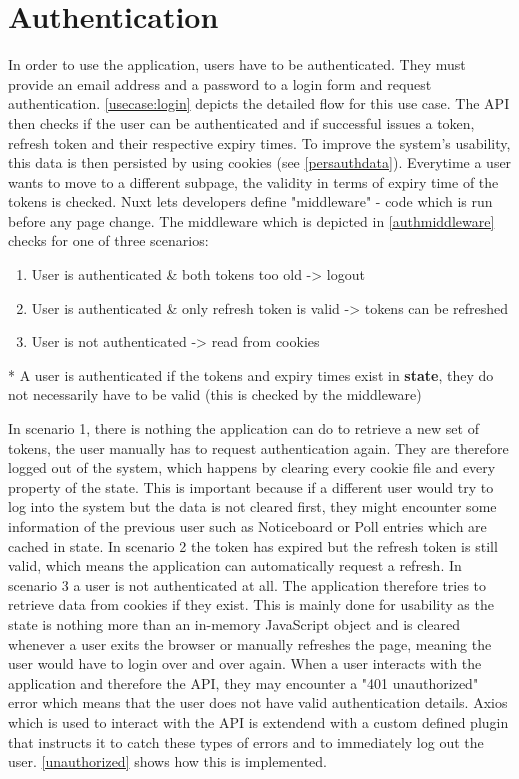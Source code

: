 \section{Authentication}
In order to use the application, users have to be authenticated. They must provide an email address and a password to a login form and request authentication. \autoref{usecase:login} depicts the detailed flow for this use case. The API then checks if the user can be authenticated and if successful issues a token, refresh token and their respective expiry times. To improve the system's usability, this data is then persisted by using cookies (see \autoref{persauthdata}). Everytime a user wants to move to a different subpage, the validity in terms of expiry time of the tokens is checked. Nuxt lets developers define "middleware" - code which is run before any page change. The middleware which is depicted in \autoref{authmiddleware} checks for one of three scenarios:

\begin{enumerate}
  \item User is authenticated \& both tokens too old -> logout
  \item User is authenticated \& only refresh token is valid -> tokens can be refreshed
  \item User is not authenticated -> read from cookies
\end{enumerate}

* A user is authenticated if the tokens and expiry times exist in \textbf{state}, they do not necessarily have to be valid (this is checked by the middleware) 

In scenario 1, there is nothing the application can do to retrieve a new set of tokens, the user manually has to request authentication again. They are therefore logged out of the system, which happens by clearing every cookie file and every property of the state. This is important because if a different user would try to log into the system but the data is not cleared first, they might encounter some information of the previous user such as Noticeboard or Poll entries which are cached in state. In scenario 2 the token has expired but the refresh token is still valid, which means the application can automatically request a refresh. In scenario 3 a user is not authenticated at all. The application therefore tries to retrieve data from cookies if they exist. This is mainly done for usability as the state is nothing more than an in-memory JavaScript object and is cleared whenever a user exits the browser or manually refreshes the page, meaning the user would have to login over and over again. When a user interacts with the application and therefore the API, they may encounter a "401 unauthorized" error which means that the user does not have valid authentication details. Axios which is used to interact with the API is extendend with a custom defined plugin that instructs it to catch these types of errors and to immediately log out the user. \autoref{unauthorized} shows how this is implemented.

